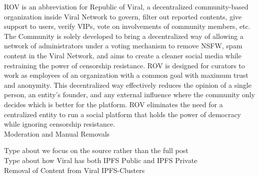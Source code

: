 \documentclass[10pt]{article}
\begin{document}
ROV is an abbreviation for Republic of Viral, a decentralized community-based organization inside Viral Network to govern, filter out reported contents, give support to users, verify VIPs, vote on involvements of community members, etc. The Community is solely developed to bring a decentralized way of allowing a network of administrators under a voting mechanism to remove NSFW, spam content in the Viral Network, and aims to create a cleaner social media while restraining the power of censorship resistance. ROV is designed for curators to work as employees of an organization with a common goal with maximum trust and anonymity. This decentralized way effectively reduces the opinion of a single person, an entity’s founder, and any external influence where the community only decides which is better for the platform. ROV eliminates the need for a centralized entity to run a social platform that holds the power of democracy while ignoring censorship resistance. \\

Moderation and Manual Removals

Type about we focus on the source rather than the full post\\
Type about how Viral has both IPFS Public and IPFS Private\\
Removal of Content from Viral IPFS-Clusters\\

\end{document}
